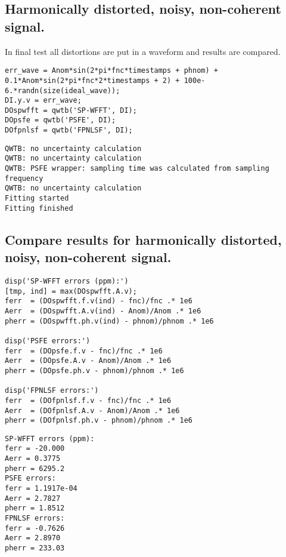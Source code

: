 {}
\subsection*{Harmonically distorted, noisy, non-coherent signal.}



In final test all distortions are put in a waveform and results are compared.

\begin{lstlisting}
err_wave = Anom*sin(2*pi*fnc*timestamps + phnom) + 0.1*Anom*sin(2*pi*fnc*2*timestamps + 2) + 100e-6.*randn(size(ideal_wave));
DI.y.v = err_wave;
DOspwfft = qwtb('SP-WFFT', DI);
DOpsfe = qwtb('PSFE', DI);
DOfpnlsf = qwtb('FPNLSF', DI);
\end{lstlisting}
\begin{lstlisting}[language={},xleftmargin=5pt,frame=none]
QWTB: no uncertainty calculation
QWTB: no uncertainty calculation
QWTB: PSFE wrapper: sampling time was calculated from sampling frequency
QWTB: no uncertainty calculation
Fitting started
Fitting finished

\end{lstlisting}


{}
\subsection*{Compare results for harmonically distorted, noisy, non-coherent signal.}

\begin{lstlisting}
disp('SP-WFFT errors (ppm):')
[tmp, ind] = max(DOspwfft.A.v);
ferr  = (DOspwfft.f.v(ind) - fnc)/fnc .* 1e6
Aerr  = (DOspwfft.A.v(ind) - Anom)/Anom .* 1e6
pherr = (DOspwfft.ph.v(ind) - phnom)/phnom .* 1e6

disp('PSFE errors:')
ferr  = (DOpsfe.f.v - fnc)/fnc .* 1e6
Aerr  = (DOpsfe.A.v - Anom)/Anom .* 1e6
pherr = (DOpsfe.ph.v - phnom)/phnom .* 1e6

disp('FPNLSF errors:')
ferr  = (DOfpnlsf.f.v - fnc)/fnc .* 1e6
Aerr  = (DOfpnlsf.A.v - Anom)/Anom .* 1e6
pherr = (DOfpnlsf.ph.v - phnom)/phnom .* 1e6
\end{lstlisting}
\begin{lstlisting}[language={},xleftmargin=5pt,frame=none]
SP-WFFT errors (ppm):
ferr = -20.000
Aerr = 0.3775
pherr = 6295.2
PSFE errors:
ferr = 1.1917e-04
Aerr = 2.7827
pherr = 1.8512
FPNLSF errors:
ferr = -0.7626
Aerr = 2.8970
pherr = 233.03

\end{lstlisting}


\stopcontents[localtoc]
